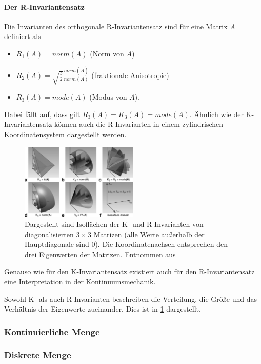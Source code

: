 \documentclass[a4paper,fontsize=12pt,toc=bib,parskip=half,ngerman]{scrartcl}
\begin{document}
\paragraph{Der R-Invariantensatz}
Die Invarianten des orthogonale R-Invariantensatz sind f\"ur eine Matrix $A$ definiert als

\begin{itemize}
	\item $R_1(A)=norm(A)$ (Norm von $A$)
	\item $R_2(A)=\sqrt{\frac{3}{2}} \frac{norm(\tilde{A})}{norm(A)}$ (fraktionale Anisotropie)
	\item $R_3(A)=mode(A)$ (Modus von $A$).
\end{itemize}

Dabei f\"allt auf, dass gilt $R_3(A) = K_3(A) = mode(A)$. \"Ahnlich wie der K-Invariantensatz k\"onnen auch die R-Invarianten in einem zylindrischen Koordinatensystem dargestellt werden.

\begin{figure}
	\centering
	\includegraphics[width=0.5\textwidth]{pictures/000.png}
	\caption{Dargestellt sind Isofl\"achen der K- und R-Invarianten von diagonalisierten $3\times 3$ Matrizen (alle Werte au{\ss}erhalb der Hauptdiagonale sind 0). Die Koordinatenachsen entsprechen den drei Eigenwerten der Matrizen. Entnommen aus \cite[S.~139]{ennis2006orthogonal}}
	\label{KRInvariants}
\end{figure}

Genauso wie f\"ur den K-Invariantensatz existiert auch f\"ur den R-Invariantensatz eine Interpretation in der Kontinuumsmechanik. 

Sowohl K- als auch R-Invarianten beschreiben die Verteilung, die \glq Gr\"o{\ss}e\grq{} und das Verh\"altnis der Eigenwerte zueinander. Dies ist in \cref{KRInvariants} dargestellt.

\subsubsection{Kontinuierliche Menge}
\subsubsection{Diskrete Menge} 
\end{document}
